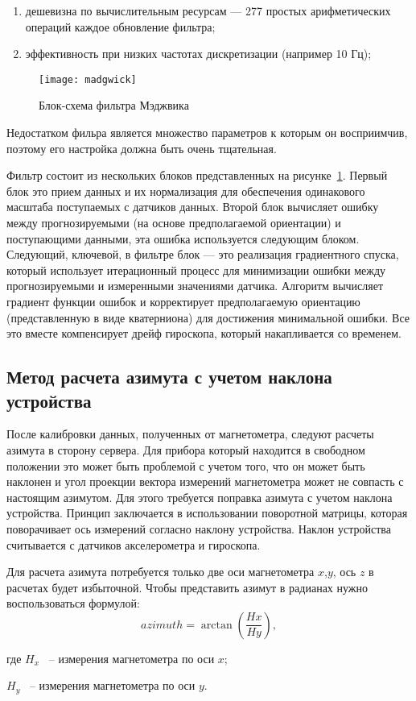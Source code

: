 \begin{enumerate}
    \item дешевизна по вычислительным ресурсам — 277 простых арифметических операций каждое обновление фильтра;
    \item эффективность при низких частотах дискретизации (например 10 Гц);
\end{enumerate}

\begin{figure}[ht]
    \centering
    \texttt{[image: madgwick]}
    \caption{Блок-схема фильтра Мэджвика}
    \label{pic::domain::madgwick}
\end{figure}

Недостатком фильра является множество параметров к которым он восприимчив, поэтому его настройка должна быть очень тщательная.

Фильтр состоит из нескольких блоков представленных на рисунке~\ref{pic::domain::madgwick}.
Первый блок это прием данных и их нормализация для обеспечения одинакового 
масштаба поступаемых с датчиков данных.
Второй блок вычисляет ошибку между прогнозируемыми (на основе предполагаемой ориентации) и поступающими данными, 
эта ошибка используется следующим блоком.
Следующий, ключевой, в фильтре блок --- это реализация градиентного спуска, который 
использует итерационный процесс для минимизации ошибки между прогнозируемыми и 
измеренными значениями датчика. Алгоритм вычисляет градиент функции ошибок и корректирует
предполагаемую ориентацию (представленную в виде кватерниона) для достижения минимальной ошибки.
Все это вместе компенсирует дрейф гироскопа, который накапливается со временем.

\subsection{Метод расчета азимута с учетом наклона устройства}

После калибровки данных, полученных от магнетометра, следуют расчеты азимута в сторону сервера.
Для прибора который находится в свободном положении это может быть проблемой с учетом того, что
он может быть наклонен и угол проекции вектора измерений магнетометра может не совпасть с настоящим азимутом.
Для этого требуется поправка азимута с учетом наклона устройства. Принцип заключается в использовании 
поворотной матрицы, которая поворачивает ось измерений согласно наклону устройства. Наклон устройства 
считывается с датчиков акселерометра и гироскопа.

Для расчета азимута потребуется только две оси магнетометра $x$,$y$, ось $z$ в расчетах будет избыточной.
Чтобы представить азимут в радианах нужно воспользоваться формулой:
\begin{equation}
    \label{eq:domain:rawAzimuth}
    azimuth = \arctan\left(\frac{Hx}{Hy}\right),
  \end{equation}
  \begin{explanationx}
    \item[где] $H_x$ ~-- измерения магнетометра по оси $x$;
    \item $H_y$ ~-- измерения магнетометра по оси $y$.
  \end{explanationx}

